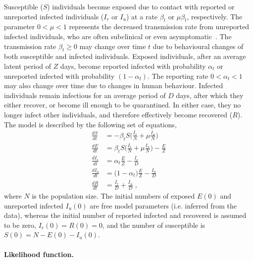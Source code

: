 \documentclass[12pt]{extarticle}
\begin{document}
{Susceptible ($S$) individuals become exposed due to contact with reported or unreported infected individuals ($I_r$ or $I_u$) at a rate $\beta_t$ or $\mu \beta_t$, respectively.
The parameter $0 < \mu < 1$ represents the decreased transmission rate from unreported infected individuals, who are often subclinical or even asymptomatic~\citep{Ferretti2020,Thompson2020}.
The transmission rate $\beta_t \ge 0$ may change over  time $t$ due to behavioural changes of both susceptible and infected individuals.
Exposed individuals, after an average latent period of $Z$ days, become reported infected with probability $\alpha_t$ or unreported infected with probability $(1-\alpha_t)$.
The reporting rate $0 < \alpha_t < 1$ may also change over time due to changes in human behaviour.
Infected individuals remain infectious for an average period of $D$ days, after which they either recover, or become ill enough to be quarantined.
In either case, they no longer infect other individuals, and therefore effectively become recovered ($R$).
The model is described by the following set of equations,
\begin{equation} \label{eq:model}
\begin{aligned}
\frac{dS}{dt} & = -\beta_t S \Big(\frac{I_r}{N} + \mu \frac{I_u}{N}\Big) \\
\frac{dE}{dt} & = \beta_t S \Big(\frac{I_r}{N} + \mu \frac{I_u}{N}\Big)  - \frac{E}{Z} \\
\frac{dI_r}{dt} & = \alpha_t \frac{E}{Z} - \frac{I_r}{D} \\
\frac{dI_u}{dt} & = \big(1-\alpha_t\big) \frac{E}{Z} - \frac{I_u}{D} \\
\frac{dR}{dt} & = \frac{I_r}{D} + \frac{I_u}{D} \;,
\end{aligned}
\end{equation}
where $N$ is the population size.
The initial numbers of exposed $E(0)$ and unreported infected $I_u(0)$ are free model parameters (i.e. inferred from the data), whereas the initial number of reported infected and recovered is assumed to be zero, $I_r(0)=R(0)=0$, and the number of susceptible is $S(0)=N-E(0)-I_u(0)$.



\paragraph*{Likelihood function.}

}
\end{document}
